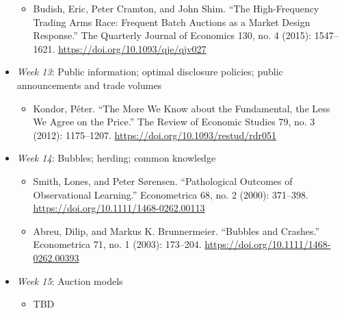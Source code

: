 \documentclass{article}
\begin{document}
\begin{itemize}
\begin{itemize}
		\item Budish, Eric, Peter Cramton, and John Shim. “The High-Frequency Trading Arms Race: Frequent Batch Auctions as a Market Design Response.” The Quarterly Journal of Economics 130, no. 4 (2015): 1547–1621. \url{https://doi.org/10.1093/qje/qjv027}
	\end{itemize}
	\item \textit{Week 13}: Public information; optimal disclosure policies; public announcements and trade volumes
	\begin{itemize}
		\item Kondor, Péter. “The More We Know about the Fundamental, the Less We Agree on the Price.” The Review of Economic Studies 79, no. 3 (2012): 1175–1207. \url{https://doi.org/10.1093/restud/rdr051}
	\end{itemize}
	\item \textit{Week 14}: Bubbles; herding; common knowledge
	\begin{itemize}
		\item Smith, Lones, and Peter Sørensen. “Pathological Outcomes of Observational Learning.” Econometrica 68, no. 2 (2000): 371–398. \url{https://doi.org/10.1111/1468-0262.00113}
		\item Abreu, Dilip, and Markus K. Brunnermeier. “Bubbles and Crashes.” Econometrica 71, no. 1 (2003): 173–204. \url{https://doi.org/10.1111/1468-0262.00393}
	\end{itemize}
	\item \textit{Week 15}: Auction models
	\begin{itemize}
		\item TBD
	\end{itemize}
\end{itemize}



\end{document}
